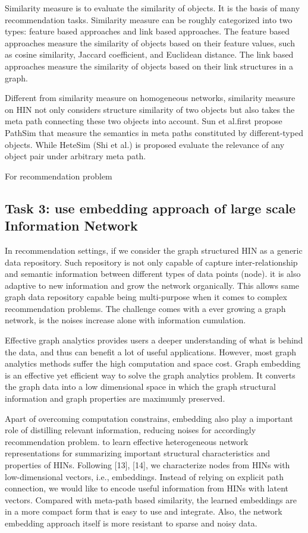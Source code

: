 \documentclass[12pt,a4 paper,title page]{article}
\begin{document}
Similarity measure is to evaluate the similarity of objects. It is the basis of many recommendation tasks. Similarity measure can be roughly categorized into two types: feature based approaches and link based approaches. The feature based approaches measure the similarity of objects based on their feature values, such as cosine similarity, Jaccard coefficient, and Euclidean distance. The link based approaches measure the similarity of objects based on their link structures in a graph.

Different from similarity measure on homogeneous networks, similarity measure on HIN not only considers structure similarity of two objects but also takes the meta path connecting these two objects into account. Sun et al.first propose PathSim that measure the semantics in meta paths constituted by different-typed objects. While HeteSim (Shi et al.) is proposed evaluate the relevance of any object pair under arbitrary meta path.

For recommendation problem


\subsection{Task 3: use embedding approach of large scale Information Network}

In recommendation settings, if we consider the graph structured HIN as a generic data repository. Such repository is not only capable of capture inter-relationship and semantic information between different types of data points (node). it is also adaptive to new information and grow the network organically. This allows same graph data repository capable being multi-purpose when it comes to complex recommendation problems. The challenge comes with a ever growing a graph network, is the noises increase alone with information cumulation.

Effective graph analytics provides users a deeper understanding of what is behind the data, and thus can benefit a lot of useful applications. However, most graph analytics methods suffer the high computation and space cost. Graph embedding is an effective yet efficient way to solve the graph analytics problem. It converts the graph data into a low dimensional space in which the graph structural information and graph properties are maximumly preserved.

Apart of overcoming computation constrains, embedding also play a important role of distilling relevant information, reducing noises for accordingly recommendation problem.
to learn effective heterogeneous network representations for summarizing important structural characteristics and properties of HINs. Following [13], [14], we characterize nodes from HINs with low-dimensional vectors, i.e., embeddings. Instead of relying on explicit path connection, we would like to encode useful information from HINs with latent vectors. Compared with meta-path based similarity, the learned embeddings are in a more compact form that is easy to use and integrate. Also, the network embedding approach itself is more resistant to sparse and noisy data. 
\end{document}
